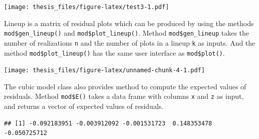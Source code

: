\documentclass{monashthesis}
\theoremstyle{definition}
\theoremstyle{definition}
\theoremstyle{definition}
\theoremstyle{definition}
\theoremstyle{remark}
\begin{document}
\begin{Shaded}
\begin{Highlighting}[]
\SpecialCharTok{$}\SpecialCharTok{$}\NormalTok{(} \NormalTok{, } \NormalTok{), } \NormalTok{, } \NormalTok{)}
\end{Highlighting}
\end{Shaded}

\texttt{[image: thesis\_files/figure-latex/test3-1.pdf]}

Lineup is a matrix of residual plots which can be produced by using the methods \texttt{mod\$gen\_lineup()} and \texttt{mod\$plot\_lineup()}. Method \texttt{mod\$gen\_lineup} takes the number of realizations \texttt{n} and the number of plots in a lineup \texttt{k} as inputs. And the method \texttt{mod\$plot\_lineup()} has the same user interface as \texttt{mod\$plot()}.

\begin{Shaded}
\begin{Highlighting}[]
\SpecialCharTok{$}\SpecialCharTok{$}\NormalTok{(} \NormalTok{, } \NormalTok{), } \NormalTok{, } \NormalTok{)}
\end{Highlighting}
\end{Shaded}

\texttt{[image: thesis\_files/figure-latex/unnamed-chunk-4-1.pdf]}

The cubic model class also provides method to compute the expected values of residuals. Method \texttt{mod\$E()} takes a data frame with columns \texttt{x} and \texttt{z} as input, and returns a vector of expected values of residuals.

\begin{Shaded}
\begin{Highlighting}[]
\SpecialCharTok{$}\SpecialCharTok{$}\NormalTok{(} \NormalTok{))}
\end{Highlighting}
\end{Shaded}

\begin{verbatim}
## [1] -0.092183951 -0.003912092 -0.001531723  0.148353478 -0.050725712
\end{verbatim}
\end{document}
